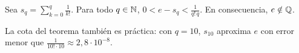 \begin{teorema}\label{teo:e-irracional}
Sea $s_q=\sum_{k=0}^{q}\frac{1}{k!}$. Para todo $q\in\mathbb{N}$, $0<e-s_q<\frac{1}{q!\,q}$. En consecuencia, $e\notin\mathbb{Q}$.
\end{teorema}

La cota del teorema también es práctica: con $q=10$, $s_{10}$ aproxima $e$ con error menor que $\frac{1}{10!\cdot10}\approx2{,}8\cdot10^{-8}$.

\addtocounter{definicion}{1}%

\addtocounter{definicion}{1}%

